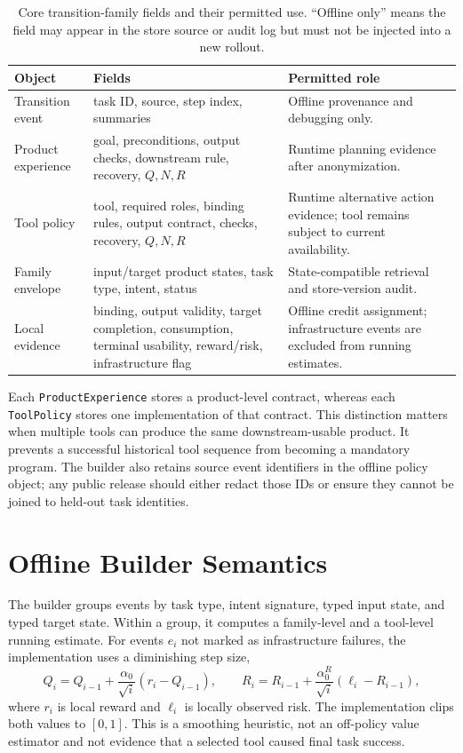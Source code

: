 \documentclass[10pt]{article}
\begin{document}
\begin{table}[t]
\centering
\caption{Core transition-family fields and their permitted use. ``Offline only'' means the field may appear in the store source or audit log but must not be injected into a new rollout.}
\small
\begin{tabular}{p{3.2cm}p{3.4cm}p{4.6cm}}
\toprule
Object & Fields & Permitted role \\
\midrule
Transition event & task ID, source, step index, summaries & Offline provenance and debugging only. \\
Product experience & goal, preconditions, output checks, downstream rule, recovery, $Q,N,R$ & Runtime planning evidence after anonymization. \\
Tool policy & tool, required roles, binding rules, output contract, checks, recovery, $Q,N,R$ & Runtime alternative action evidence; tool remains subject to current availability. \\
Family envelope & input/target product states, task type, intent, status & State-compatible retrieval and store-version audit. \\
Local evidence & binding, output validity, target completion, consumption, terminal usability, reward/risk, infrastructure flag & Offline credit assignment; infrastructure events are excluded from running estimates. \\
\bottomrule
\end{tabular}
\end{table}

Each \texttt{ProductExperience} stores a product-level contract, whereas each \texttt{ToolPolicy} stores one implementation of that contract. This distinction matters when multiple tools can produce the same downstream-usable product. It prevents a successful historical tool sequence from becoming a mandatory program. The builder also retains source event identifiers in the offline policy object; any public release should either redact those IDs or ensure they cannot be joined to held-out task identities.

\section{Offline Builder Semantics}
The builder groups events by task type, intent signature, typed input state, and typed target state. Within a group, it computes a family-level and a tool-level running estimate. For events $e_i$ not marked as infrastructure failures, the implementation uses a diminishing step size,
\begin{equation}
Q_i = Q_{i-1} + \frac{\alpha_0}{\sqrt{i}}(r_i-Q_{i-1}),\qquad
R_i = R_{i-1} + \frac{\alpha^R_0}{\sqrt{i}}(\ell_i-R_{i-1}),
\end{equation}
where $r_i$ is local reward and $\ell_i$ is locally observed risk. The implementation clips both values to $[0,1]$. This is a smoothing heuristic, not an off-policy value estimator and not evidence that a selected tool caused final task success.
\end{document}
